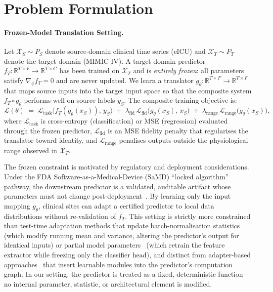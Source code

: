 
\section{Problem Formulation}
\label{sec:formulation}

\paragraph{Frozen-Model Translation Setting.}
Let $\mathcal{X}_S \sim P_S$ denote source-domain clinical time series (eICU) and $\mathcal{X}_T \sim P_T$ denote the target domain (MIMIC-IV).
A target-domain predictor $f_T : \mathbb{R}^{T \times F} \to \mathbb{R}^{T \times C}$ has been trained on $\mathcal{X}_T$ and is \emph{entirely frozen}: all parameters satisfy $\nabla_\phi f_T = 0$ and are never updated.
We learn a translator $g_\theta : \mathbb{R}^{T \times F} \to \mathbb{R}^{T \times F}$ that maps source inputs into the target input space so that the composite system $f_T \circ g_\theta$ performs well on source labels $y_S$.
The composite training objective is:
\begin{equation}
\label{eq:composite}
\mathcal{L}(\theta) \;=\; \mathcal{L}_{\mathrm{task}}\!\bigl(f_T(g_\theta(x_S)),\, y_S\bigr) \;+\; \lambda_{\mathrm{fid}}\,\mathcal{L}_{\mathrm{fid}}\!\bigl(g_\theta(x_S),\, x_S\bigr) \;+\; \lambda_{\mathrm{range}}\,\mathcal{L}_{\mathrm{range}}\!\bigl(g_\theta(x_S)\bigr),
\end{equation}
where $\mathcal{L}_{\mathrm{task}}$ is cross-entropy (classification) or MSE (regression) evaluated through the frozen predictor, $\mathcal{L}_{\mathrm{fid}}$ is an MSE fidelity penalty that regularises the translator toward identity, and $\mathcal{L}_{\mathrm{range}}$ penalises outputs outside the physiological range observed in $\mathcal{X}_T$.

The frozen constraint is motivated by regulatory and deployment considerations.
Under the FDA Software-as-a-Medical-Device (SaMD) ``locked algorithm'' pathway, the downstream predictor is a validated, auditable artifact whose parameters must not change post-deployment~\cite{fdaaiml2021}.
By learning only the input mapping $g_\theta$, clinical sites can adapt a certified predictor to local data distributions without re-validation of $f_T$.
This setting is strictly more constrained than test-time adaptation methods that update batch-normalisation statistics~\cite{wang2021tent} (which modify running mean and variance, altering the predictor's output for identical inputs) or partial model parameters~\cite{liang2020shot} (which retrain the feature extractor while freezing only the classifier head), and distinct from adapter-based approaches~\cite{houlsby2019adapters} that insert learnable modules into the predictor's computation graph. In our setting, the predictor is treated as a fixed, deterministic function---no internal parameter, statistic, or architectural element is modified.

